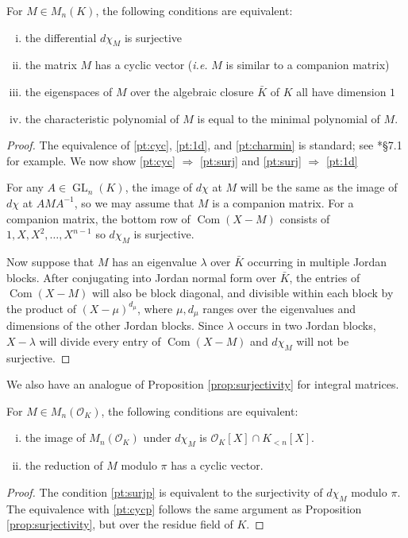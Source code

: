 \documentclass{sig-alternate-05-2015}
\DeclareMathOperator{\GL}{GL}
\DeclareMathOperator{\com}{Com}
\newcommand{\OK}{\mathcal{O}_K}
\begin{document}
\begin{prop}
\label{prop:surjectivity}
For $M \in M_n(K)$, the following conditions are equivalent:
\begin{enumerate}[(i)]
\renewcommand{\itemsep}{0pt}
\item \label{pt:surj} the differential $d\chi_M$ is surjective
\item \label{pt:cyc} the matrix $M$ has a cyclic vector (\emph{i.e.} $M$ is similar
to a companion matrix)
\item \label{pt:1d} the eigenspaces of $M$ over the algebraic
closure $\bar{K}$ of $K$ all have dimension $1$
\item \label{pt:charmin} the characteristic polynomial of $M$ is equal to the minimal polynomial of $M$.
\end{enumerate}
\end{prop}

\begin{proof}
The equivalence of \eqref{pt:cyc}, \eqref{pt:1d}, and \eqref{pt:charmin} is standard; see
\cite{hoffman-kunze:LinearAlgebra}*{\S 7.1} for example.  We now show
\eqref{pt:cyc} $\Rightarrow$ \eqref{pt:surj} and \eqref{pt:surj} $\Rightarrow$ \eqref{pt:1d}

For any $A \in \GL_n(K)$, the image of $d\chi$ at $M$ will be the same
as the image of $d\chi$ at $AMA^{-1}$, so we may assume that
$M$ is a companion matrix.  For a companion matrix, the bottom row of
$\com(X-M)$ consists of $1, X, X^2, \dots, X^{n-1}$ so $d\chi_M$ is surjective.

Now suppose that $M$ has an eigenvalue $\lambda$ over $\bar{K}$ occurring in multiple Jordan blocks.
After conjugating into Jordan normal form over $\bar{K}$, the entries of $\com(X-M)$
will also be block diagonal, and divisible within each block by the product of $(X-\mu)^{d_\mu}$,
where $\mu, d_\mu$ ranges over the eigenvalues and dimensions of the other Jordan blocks.
Since $\lambda$ occurs in two Jordan blocks,
$X - \lambda$ will divide every entry of $\com(X-M)$ and $d\chi_M$ will not be surjective.
\end{proof}

We also have an analogue of Proposition \ref{prop:surjectivity} for integral matrices.

\begin{prop}
\label{prop:intsurj}
For $M \in M_n(\OK)$, the following conditions are equivalent:
\begin{enumerate}[(i)]
\renewcommand{\itemsep}{0pt}
\item \label{pt:surjp} the image of $M_n(\OK)$ under $d\chi_M$ is $\OK[X] \cap K_{<n}[X]$.
\item \label{pt:cycp} the reduction of $M$ modulo $\pi$ has a cyclic vector.
\end{enumerate}
\end{prop}
\begin{proof}
The condition \eqref{pt:surjp} is equivalent to the surjectivity of $d\chi_M$ modulo $\pi$.  The equivalence with
\eqref{pt:cycp} follows the same argument as Proposition \ref{prop:surjectivity}, but over the residue field of $K$.
\end{proof}
\end{document}
